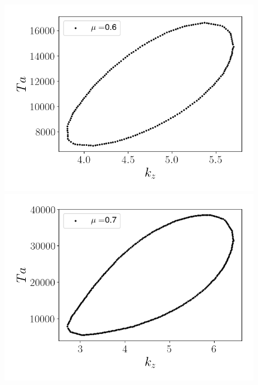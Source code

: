 \documentclass[varwidth]{standalone}
\begin{document}

\begin{figure} 
\includegraphics[scale = 0.18]{island_eta_0.9_mu_0.6_m_-20.png}
\includegraphics[scale = 0.18]{island_eta_0.9_mu_0.7_m_-20.png} 

\end{figure}
\end{document}
